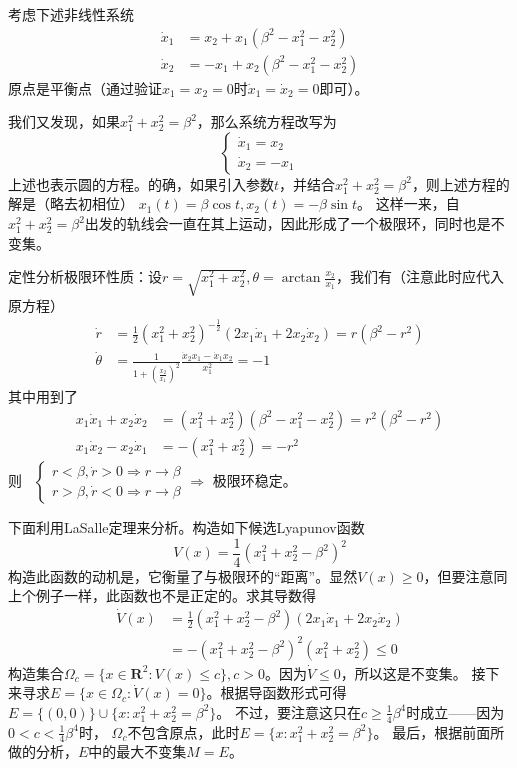 \begin{example}[收敛至极限环]
	考虑下述非线性系统\begin{align*}
		\dot{x}_1&=x_2+x_1(\beta^2-x_1^2-x_2^2)\\
		\dot{x}_2&=-x_1+x_2(\beta^2-x_1^2-x_2^2)
	\end{align*}
	原点是平衡点（通过验证$x_1=x_2=0$时$\dot{x}_1=\dot{x}_2=0$即可）。

	我们又发现，如果$x_1^2+x_2^2=\beta^2$，那么系统方程改写为\[\left\{\begin{array}{l}
    \dot{x}_1 = x_2\\
    \dot{x}_2 = - x_1
  \end{array}\right.\]
  上述也表示圆的方程。的确，如果引入参数$t$，并结合$x_1^2+x_2^2=\beta^2$，则上述方程的解是（略去初相位）
  $x_1 (t) = \beta\cos  t, x_2 (t) = - \beta \sin  t$。
  这样一来，自$x_1^2+x_2^2=\beta^2$出发的轨线会一直在其上运动，因此形成了一个极限环，同时也是不变集。

  \begin{note}
    定性分析极限环性质：设$r = \sqrt{x^2_1 + x^2_2}, \theta = \arctan \frac{x_2}{x_1}$，我们有（注意此时应代入原方程）
  \begin{align*}
    \dot{r}& = \frac{1}{2}(x_{1}^{2}+x_{2}^{2})^{-\frac{1}{2}}(2x_{1}\dot{x}_{1}+2x_{2}\dot{x}_{2})= r (\beta^2 - r^2)\\
    \dot{\theta} & =\frac{1}{1+(\frac{x_{2}}{x_{1}})^{2}}\frac{\dot{x}_{2}x_{1}-\dot{x}_{1}x_{2}}{x_{1}^{2}}= - 1
  \end{align*}
  其中用到了
  \begin{align*}
    x_1\dot{x}_1+x_2\dot{x}_2& = (x_1^2+x_2^2)(\beta^2-x_1^2-x_2^2)= r^2 (\beta^2 - r^2)\\
    x_1\dot{x}_2-x_2\dot{x}_1 & = -(x_1^2+x_2^2)=- r^2
  \end{align*}
  则 \ $\left\{\begin{array}{l}
    r < \beta, \dot{r} > 0 \Rightarrow r \rightarrow \beta\\
    r > \beta, \dot{r} < 0 \Rightarrow r \rightarrow \beta
  \end{array}\right. \Rightarrow$ 极限环稳定。
\end{note}

  下面利用LaSalle定理来分析。构造如下候选Lyapunov函数\[ V (x) = \frac{1}{4} (x^2_1 + x^2_2 - \beta^2)^2 \]
  构造此函数的动机是，它衡量了与极限环的“距离”。显然$V (x) \geq 0$，但要注意同上个例子一样，此函数也不是正定的。求其导数得
  \begin{align*}
    \dot{V} (x) & =  \frac{1}{2} (x^2_1 + x^2_2 - \beta^2) (2 x_1 \dot{x}_1 +
    2 x_2 \dot{x}_2)\\
    & =  - (x^2_1 + x^2_2 - \beta^2)^2 (x^2_1 + x^2_2)\leq 0
  \end{align*}
  构造集合$\Omega_c =
  \{ x \in \mathbf{R}^2 : V (x) \leq c \},c > 0$。因为$\dot{V} \leq 0$，所以这是不变集。
  接下来寻求$E = \{ x \in \Omega_c : \dot{V} (x) = 0 \}$。根据导函数形式可得$E = \{
  (0, 0) \} \cup \{ x : x^2_1 + x^2_2 = \beta^2 \}$。
  不过，要注意这只在$c \ge \frac{1}{4} \beta^4$时成立——因为$0 < c < \frac{1}{4} \beta^4$时，
  $\Omega_c $不包含原点，此时$E=\{ x : x^2_1 + x^2_2 = \beta^2 \}$。
  最后，根据前面所做的分析，$E$中的最大不变集$M = E$。
  

\end{example}
